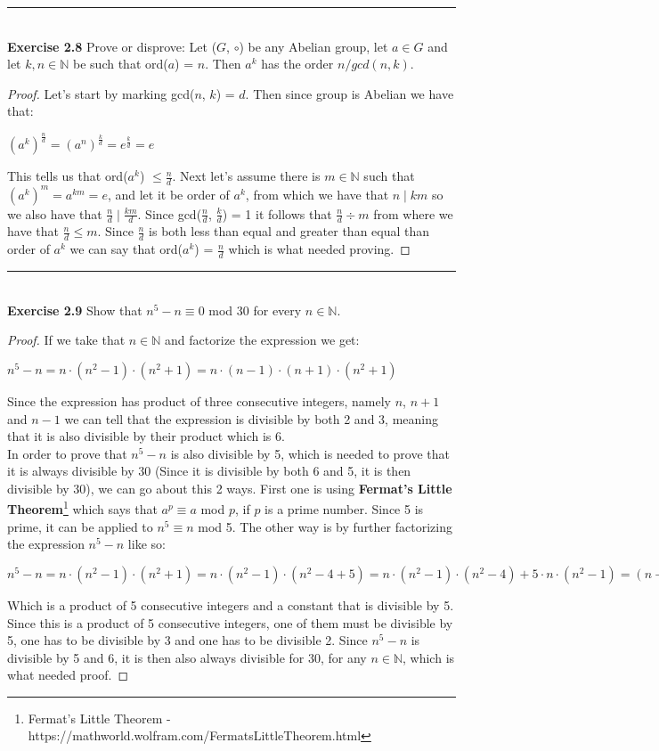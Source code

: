 \documentclass{article}
\begin{document}
\noindent\rule{12cm}{0.4pt}\\
\noindent \textbf{Exercise 2.8} Prove or disprove: Let ($G$, $\circ$) be any Abelian group, let $a \in G$ and let $k, n \in \mathbb{N}$ be such that ord($a$) = $n$. Then $a^{k}$ has the order $n/gcd(n,k)$.
\begin{proof}
Let's start by marking gcd($n$, $k$) = $d$. Then since group is Abelian we have that:
\begin{center}
$(a^k)^{\frac{n}{d}} = (a^n)^{\frac{k}{d}}= e^{\frac{k}{d}} = e$
\end{center}
This tells us that ord($a^k$) $\leq \frac{n}{d}$. Next let's assume there is $m \in \mathbb{N}$ such that $(a^k)^m=a^{km}=e$, and let it be order of $a^k$, from which we have that $n \mid km$ so we also have that $\frac{n}{d} \mid \frac{km}{d}$. Since gcd($\frac{n}{d}$, $\frac{k}{d}$) = 1 it follows that $\frac{n}{d} \div m$ from where we have that $\frac{n}{d} \leq m$. Since $\frac{n}{d}$ is both less than equal and greater than equal than order of $a^k$ we can say that ord($a^k$) = $\frac{n}{d}$ which is what needed proving.
\end{proof}



\noindent\rule{12cm}{0.4pt}\\
\noindent \textbf{Exercise 2.9} Show that $n^5 - n \equiv 0$ mod 30 for every $n \in \mathbb{N}$.
\begin{proof}
If we take that $n \in \mathbb{N}$ and factorize the expression we get:
\begin{center}
$n^5 - n = n \cdot (n^2 - 1) \cdot (n^2 + 1) = n \cdot (n - 1) \cdot (n + 1) \cdot (n^2 + 1)$	
\end{center}
Since the expression has product of three consecutive integers, namely $n$, $n+1$ and $n-1$ we can tell that the expression is divisible by both 2 and 3, meaning that it is also divisible by their product which is 6.\\
In order to prove that $n^5 - n$ is also divisible by 5, which is needed to prove that it is always divisible by 30 (Since it is divisible by both 6 and 5, it is then divisible by 30), we can go about this 2 ways. First one is using \textbf{Fermat's Little Theorem}\footnote{Fermat's Little Theorem - https://mathworld.wolfram.com/FermatsLittleTheorem.html} which says that $a^p \equiv a$ mod $p$, if $p$ is a prime number. Since 5 is prime, it can be applied to $n^5 \equiv n$ mod 5. The other way is by further factorizing the expression $n^5 - n$ like so:
\begin{center}
$n^5 - n = n \cdot (n^2 - 1) \cdot (n^2 + 1) = n \cdot (n^2 - 1) \cdot (n^2 - 4 + 5) = n \cdot (n^2 - 1) \cdot (n^2 - 4) + 5 \cdot n \cdot (n^2 - 1) = (n - 2) \cdot (n -1) \cdot n \cdot (n + 1) \cdot (n + 2) + 5$
\end{center}
Which is a product of 5 consecutive integers and a constant that is divisible by 5. Since this is a product of 5 consecutive integers, one of them must be divisible by 5, one has to be divisible by 3 and one has to be divisible 2. Since $n^5 - n$ is divisible by 5 and 6, it is then also always divisible for 30, for any $n \in \mathbb{N}$, which is what needed proof.

\end{proof}
\end{document}
